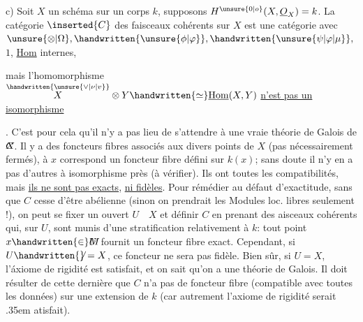 c) Soit $X$ un schéma  sur un corps $k$, supposons $H^{\unsure{0|o}}(X,\underline{O}_{X})=k$. La catégorie $\inserted{C}$ des faisceaux cohérents sur $X$ est une catégorie avec $\unsure{\otimes|\Omega},\handwritten{\unsure{\phi|\varphi}},\handwritten{\unsure{\psi|\varphi|\mu}},$  $1$, \uline{Hom} internes,  mais l'homomorphisme $\overset{\handwritten{\unsure{\vee|\nu|v}}}{X}\otimes Y\handwritten{\simeq}\underline{\mathrm{Hom}}(X,Y)$ \uline{n'est pas un isomorphisme}. C'est pour cela qu'il n'y a pas lieu de s'attendre à une vraie théorie de Galois de $\rlap{\(X\)}C$. Il y a des foncteurs fibres associés aux divers points de $X$ (pas nécessairement fermés), à $x$ correspond un foncteur fibre défini sur $k(x)$; sans doute il n'y en a pas d'autres à isomorphisme près (à vérifier). Ils ont toutes les compatibilités, mais \uline{ils ne sont pas exacts},  \uline{ni fidèles}. Pour rémédier au défaut d'exactitude, sans que $C$ cesse d'être abélienne (sinon on prendrait les Modules loc. libres seulement !), on peut se fixer un ouvert $U\quad X$ et définir $C$ en prenant des aisceaux cohérents qui, sur $U$, sont munis d'une stratification relativement à $k$: tout point $x\handwritten{\in}\rlap{\(M\)}U$ fournit un foncteur fibre exact. Cependant, si $U\handwritten{\not}=X$, ce foncteur ne sera pas fidèle. Bien sûr, si $U=X$, l'áxiome de rigidité est satisfait, et on sait qu'on a une théorie de Galois. Il doit résulter de cette dernière que $C$ n'a pas de foncteur fibre (compatible avec toutes les données) sur une extension de $k$ (car autrement l'axiome de rigidité serait \kern.35em atisfait).

